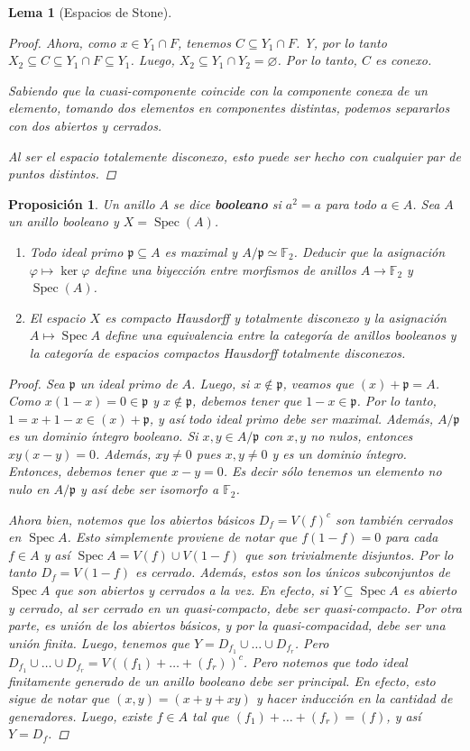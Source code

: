 \documentclass[11pt,a4paper, spanish,oneside,fleqn]{article}
\newtheorem{lem}[teo]{Lema}
\newtheorem{prop}[teo]{Proposición}
\theoremstyle{definition}
\newcommand{\FF}{\mathbb{F}}
\let\emptyset\varnothing
\DeclareMathOperator{\spec}{Spec}
\begin{document}
\begin{lem}[Espacios de Stone]
\begin{proof}
Ahora, como $x\in Y_1\cap F$, tenemos $C \subseteq Y_1\cap F$. Y, por lo tanto
$X_2 \subseteq C \subseteq Y_1 \cap F \subseteq Y_1$.
Luego, $X_2 \subseteq Y_1 \cap Y_2 = \emptyset$. Por lo tanto, $C$ es conexo.

Sabiendo que la cuasi-componente coincide con la componente conexa de un elemento,
tomando dos elementos en componentes distintas, podemos separarlos con dos abiertos
y cerrados.

Al ser el espacio totalemente disconexo, esto puede ser hecho con cualquier par
de puntos distintos.


\end{proof}
\end{lem}

\begin{prop}
Un anillo $A$ se dice \textbf{booleano} si $a^2 = a$ para todo $a\in A$. Sea $A$ un anillo booleano y $X=\spec(A)$.
\begin{enumerate}
\item Todo ideal primo $\mathfrak{p}\subseteq A$ es maximal y $A/\mathfrak{p}\simeq \FF_2$. Deducir que la asignación $\varphi\mapsto \ker\varphi$ define una biyección entre morfismos de anillos $A\to \FF_2$ y $\spec(A)$.
\item El espacio $X$ es compacto Hausdorff y totalmente disconexo y la asignación $A\mapsto \spec A$ define una equivalencia entre la categoría de anillos booleanos y la categoría de espacios compactos Hausdorff totalmente disconexos. 
\end{enumerate}
\begin{proof}
Sea $\mathfrak{p}$ un ideal primo de $A$. Luego, si $x\notin \mathfrak{p}$, veamos que $(x)+\mathfrak{p} = A$. Como $x(1-x) = 0\in\mathfrak{p}$ y $x\notin \mathfrak{p}$, debemos tener que $1-x\in\mathfrak{p}$. Por lo tanto, $1 = x + 1-x \in (x) + \mathfrak{p}$, y así todo ideal primo debe ser maximal. Además, $A/\mathfrak{p}$ es un dominio íntegro booleano. Si $x,y\in A/\mathfrak{p}$ con $x,y$ no nulos, entonces $xy(x-y)=0$. Además, $xy \neq 0$ pues $x,y\neq 0$ y es un dominio íntegro. Entonces, debemos tener que $x-y=0$. Es decir sólo tenemos un elemento no nulo en $A/\mathfrak{p}$ y así debe ser isomorfo a $\FF_2$.

Ahora bien, notemos que los abiertos básicos $D_f = V(f)^c$ son también cerrados en $\spec A$. Esto simplemente proviene de notar que $f(1-f)=0$ para cada $f\in A$ y así $\spec A = V(f) \cup V(1-f)$ que son trivialmente disjuntos. Por lo tanto $D_f = V(1-f)$ es cerrado. Además, estos son los únicos subconjuntos de $\spec A$ que son abiertos y cerrados a la vez. En efecto, si $Y\subseteq \spec A$ es abierto y cerrado, al ser cerrado en un quasi-compacto, debe ser quasi-compacto. Por otra parte, es unión de los abiertos básicos, y por la quasi-compacidad, debe ser una unión finita. Luego, tenemos que $Y=D_{f_1}\cup\ldots\cup D_{f_r}$. Pero $D_{f_1}\cup\ldots \cup D_{f_r} = V((f_1)+\ldots + (f_r))^c$. Pero notemos que todo ideal finitamente generado de un anillo booleano debe ser principal. En efecto, esto sigue de notar que $(x,y) = (x+y+xy)$ y hacer inducción en la cantidad de generadores. Luego, existe $f\in A$ tal que $(f_1)+\ldots + (f_r) = (f)$, y así $Y = D_f$.


\end{proof}
\end{prop}
\end{document}

